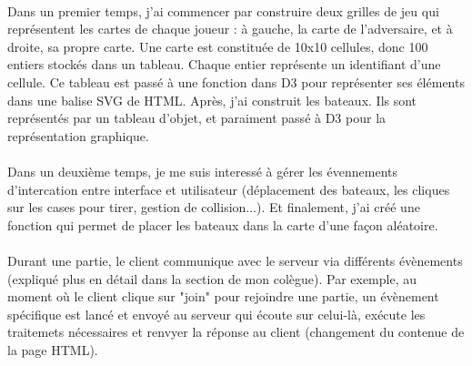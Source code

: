 \documentclass[a4paper, 11pt]{article}
\begin{document}
\paragraph{} Dans un premier temps, j'ai commencer par construire deux grilles de jeu qui représentent les cartes de chaque joueur : à
gauche, la carte de l'adversaire, et à droite, sa propre carte. Une carte est constituée de 10x10 cellules, donc 100 entiers stockés dans
un tableau. Chaque entier représente un identifiant d'une cellule. Ce tableau est passé à une fonction dans D3 pour représenter ses 
éléments dans une balise SVG de HTML. Après, j'ai construit les bateaux. Ils sont représentés par un tableau d'objet, et paraiment 
passé à D3 pour la représentation graphique.
\paragraph{} Dans un deuxième temps, je me suis interessé à gérer les évennements d'intercation entre interface et utilisateur (déplacement
des bateaux, les cliques sur les cases pour tirer, gestion de collision...). Et finalement, j'ai créé une fonction qui permet de placer les
bateaux dans la carte d'une façon aléatoire.
\paragraph{} Durant une partie, le client communique avec le serveur via différents évènements (expliqué plus en détail dans la section de mon colègue). Par exemple,
au moment où le client clique sur "join" pour rejoindre une partie, un évènement spécifique est lancé et envoyé au serveur qui écoute sur celui-là, exécute
les traitemets nécessaires et renvyer la réponse au client (changement du contenue de la page HTML).
\end{document}
